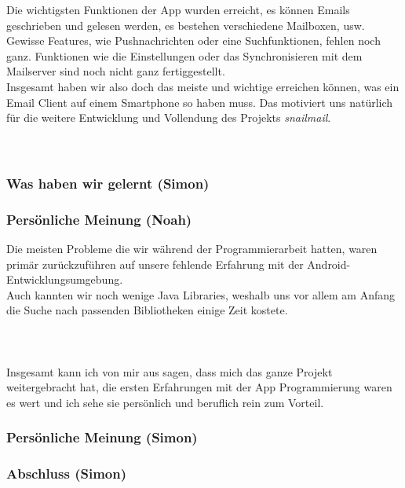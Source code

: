 \documentclass[a4paper,10pt]{scrartcl}
\begin{document}
\begin{multicols}{3}
Die wichtigsten Funktionen der App wurden erreicht, es können Emails
geschrieben und gelesen werden, es bestehen verschiedene Mailboxen, usw.
Gewisse Features, wie Pushnachrichten oder eine Suchfunktionen, fehlen
noch ganz. Funktionen wie die Einstellungen oder das Synchronisieren mit
dem Mailserver sind noch nicht ganz fertiggestellt. \\

Insgesamt haben wir also doch das meiste und wichtige erreichen können,
was ein Email Client auf einem Smartphone so haben muss. Das motiviert
uns natürlich für die weitere Entwicklung und Vollendung des Projekts
\emph{snailmail}.\\\\\\

\subsubsection*{Was haben wir gelernt (Simon)}

\subsubsection*{Persönliche Meinung (Noah)}

Die meisten Probleme die wir während der Programmierarbeit hatten, waren
primär zurückzuführen auf unsere fehlende Erfahrung mit der
Android-Entwicklungsumgebung.\\

Auch kannten wir noch wenige Java Libraries, weshalb uns vor allem am
Anfang die Suche nach passenden Bibliotheken einige Zeit kostete.\\\\\\\\

Insgesamt kann ich von mir aus sagen, dass mich das ganze Projekt
weitergebracht hat, die ersten Erfahrungen mit der App Programmierung
waren es wert und ich sehe sie persönlich und beruflich rein zum
Vorteil.\\

\subsubsection*{Persönliche Meinung (Simon)}

\subsubsection*{Abschluss (Simon)}

\end{multicols}
\end{document}
